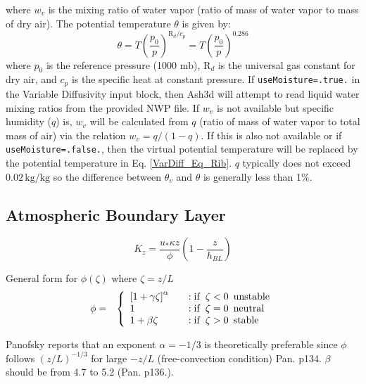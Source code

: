 where $w_v$ is the mixing ratio of water vapor
(ratio of mass of water vapor to mass of dry air). %
The potential temperature $\theta$ is given by:
\begin{equation}
\theta = T \left( \frac{p_0}{p}\right)^{\mathrm{R}_{d}/c_p} = T \left( \frac{p_0}{p}\right)^{0.286}
\end{equation}
where $p_0$ is the reference pressure (1000 $\mathrm{mb}$), $\mathrm{R}_{d}$ is the universal
gas constant for dry air, and $c_p$ is the specific heat at constant pressure.
If \texttt{useMoisture=.true.} in the Variable Diffusivity input block, then Ash3d will attempt to
read liquid water mixing ratios from the provided NWP file.
If $w_v$ is not available but specific humidity ($q$) is, $w_v$ will be calculated from $q$ (ratio of mass of
water vapor to total mass of air) via the relation $w_v=q/(1-q)$.
If this is also not available or if \texttt{useMoisture=.false.}, then
the virtual potential temperature will be replaced by the potential temperature in Eq. \ref{VarDiff_Eq_Rib}.
$q$ typically does not exceed $0.02 \, \mathrm{kg}/\mathrm{kg}$ so the difference between $\theta_v$
and $\theta$ is generally less than 1\%.


\subsection{Atmospheric Boundary Layer}
\begin{equation}
K_z = \frac{u_{*} \kappa z}{\phi} \left( 1-\frac{z}{h_{BL}} \right)
\end{equation}

General form for $\phi(\zeta)$ where $\zeta = z/L$
\begin{eqnarray}\label{EqPhiB}
\phi &=& \left\{ \begin{array} {l@{\quad \quad}l}
 \left[ 1+\gamma \zeta\right]^{\alpha}  &:  \mathrm{if}\,\,\, \zeta < 0 \,\,\, \mathrm{unstable} \\
1                                       &:  \mathrm{if}\,\,\, \zeta = 0 \,\,\, \mathrm{neutral} \\
1 + \beta \zeta                         &:  \mathrm{if}\,\,\, \zeta > 0 \,\,\, \mathrm{stable}
\end{array}
\right.
\end{eqnarray}

Panofsky reports that an exponent $\alpha=-1/3$ is theoretically preferable
since $\phi$ follows $(z/L)^{-1/3}$ for large $-z/L$ (free-convection condition) Pan. p134.
$\beta$ should be from 4.7 to 5.2 (Pan. p136.).

